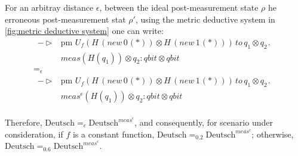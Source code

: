 For an arbitray distance $\epsilon$, between the ideal post-measurement state $\rho$ he erroneous post-measurement stat $\rho'$,  using the metric deductive system in \autoref{fig:metric deductive system} one can write:
  \begin{align*}
     \hspace{3pt} - \triangleright & \hspace{3pt} \text{pm} \hspace{4pt}  U_{f}(H  \hspace{2pt}   ( \textit{new}   \hspace{2pt}  0 \hspace{1pt}(*)) \otimes H  \hspace{2pt}   ( \textit{new}   \hspace{2pt}  1 \hspace{1pt}(*))) \hspace{2pt}  \textit{to} \hspace{2pt} q_{1} \otimes q_{2} \hspace{1pt}. \\
     &\hspace{3pt} \textit{meas} (H( q_{1})) \otimes q_{2} : \textit{qbit} \otimes \textit{qbit}& \\
     =_{\epsilon} & \\
     \hspace{3pt} - \triangleright & \hspace{3pt} \text{pm} \hspace{4pt}  U_{f}(H  \hspace{2pt}   ( \textit{new}   \hspace{2pt}  0 \hspace{1pt}(*)) \otimes H  \hspace{2pt}   ( \textit{new}   \hspace{2pt}  1 \hspace{1pt}(*))) \hspace{2pt}  \textit{to} \hspace{2pt} q_{1} \otimes q_{2} \hspace{1pt}. \\
     &\hspace{3pt} \textit{meas}^{\epsilon} (H( q_{1})) \otimes q_{2} : \textit{qbit} \otimes \textit{qbit}& \\
     \end{align*}
  
  Therefore, $\text{Deutsch}=_{\epsilon} \text{Deutsch}^{\textit{meas}^{\epsilon}}$, and consequently, for scenario under consideration, if $f$ is a constant function, $\text{Deutsch} =_{0.2} \text{Deutsch}^{\textit{meas}^{\epsilon}}$; otherwise, $\text{Deutsch} =_{0.6} \text{Deutsch}^{\textit{meas}^{\epsilon}}$.

